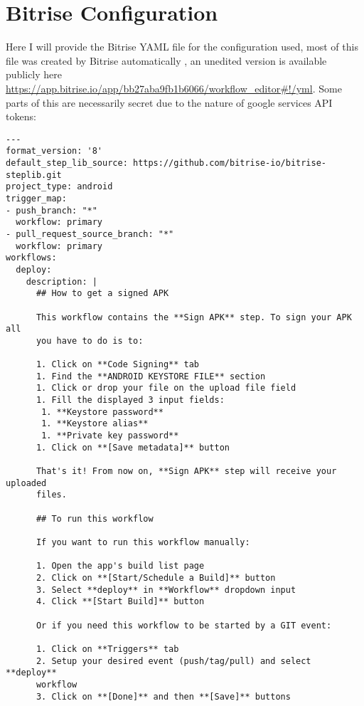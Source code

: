 \chapter{Bitrise Configuration}

Here I will provide the Bitrise YAML file for the configuration used, most of this file was created by Bitrise automatically \cite{BITRISE}, an unedited version is available publicly here \url{https://app.bitrise.io/app/bb27aba9fb1b6066/workflow_editor#!/yml}. Some parts of this are necessarily secret due to the nature of google services API tokens:

\begin{verbatim}
---
format_version: '8'
default_step_lib_source: https://github.com/bitrise-io/bitrise-steplib.git
project_type: android
trigger_map:
- push_branch: "*"
  workflow: primary
- pull_request_source_branch: "*"
  workflow: primary
workflows:
  deploy:
    description: |
      ## How to get a signed APK

      This workflow contains the **Sign APK** step. To sign your APK all
      you have to do is to:

      1. Click on **Code Signing** tab
      1. Find the **ANDROID KEYSTORE FILE** section
      1. Click or drop your file on the upload file field
      1. Fill the displayed 3 input fields:
       1. **Keystore password**
       1. **Keystore alias**
       1. **Private key password**
      1. Click on **[Save metadata]** button

      That's it! From now on, **Sign APK** step will receive your uploaded 
      files.

      ## To run this workflow

      If you want to run this workflow manually:

      1. Open the app's build list page
      2. Click on **[Start/Schedule a Build]** button
      3. Select **deploy** in **Workflow** dropdown input
      4. Click **[Start Build]** button

      Or if you need this workflow to be started by a GIT event:

      1. Click on **Triggers** tab
      2. Setup your desired event (push/tag/pull) and select **deploy** 
      workflow
      3. Click on **[Done]** and then **[Save]** buttons


\end{verbatim}
